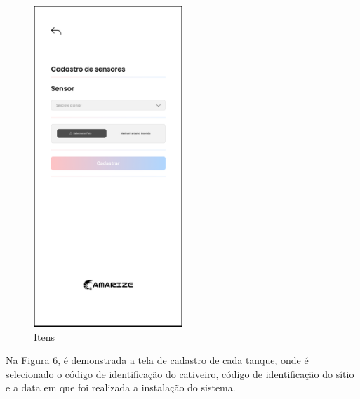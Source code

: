 \begin{figure}[!htb]
    \centering
    \caption{Itens}%
    \label{fig:sensor}
    \includegraphics[width = 0.5\textwidth]{Imagem/Cadastrar_Sensor.png}
\end{figure}

\newpage

Na Figura 6, é demonstrada a tela de cadastro de cada tanque, onde é selecionado o código de identificação do cativeiro, código de identificação do sítio e a data em que foi realizada a instalação do sistema.

